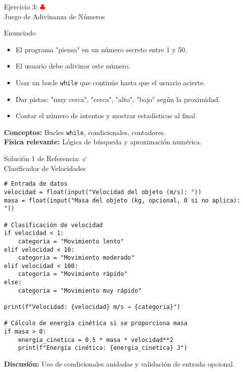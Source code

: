 \documentclass[10pt]{beamer}
\begin{document}
\begin{frame}{Ejercicio 3: \hfill \textcolor{red}{$\clubsuit$} \\ Juego de Adivinanza de Números}
  \begin{block}{Enunciado}
    \begin{itemize}
      \item El programa "piensa" en un número secreto entre 1 y 50.
      \item El usuario debe adivinar este número.
      \item Usar un bucle \texttt{while} que continúe hasta que el usuario acierte.
      \item Dar pistas: "muy cerca", "cerca", "alto", "bajo" según la proximidad.
      \item Contar el número de intentos y mostrar estadísticas al final.
    \end{itemize}
  \end{block}
  
  \textbf{Conceptos:} Bucles \texttt{while}, condicionales, contadores.
  \\
  \textbf{Física relevante:} Lógica de búsqueda y aproximación numérica.
\end{frame}

\begin{frame}[fragile]{Solución 1 de Referencia: \hfill \textcolor{green}{$\checkmark$} \\ Clasificador de Velocidades}
\begin{verbatim}
# Entrada de datos
velocidad = float(input("Velocidad del objeto (m/s): "))
masa = float(input("Masa del objeto (kg, opcional, 0 si no aplica): "))

# Clasificación de velocidad
if velocidad < 1:
    categoria = "Movimiento lento"
elif velocidad < 10:
    categoria = "Movimiento moderado"
elif velocidad < 100:
    categoria = "Movimiento rápido"
else:
    categoria = "Movimiento muy rápido"

print(f"Velocidad: {velocidad} m/s → {categoria}")

# Cálculo de energía cinética si se proporciona masa
if masa > 0:
    energia_cinetica = 0.5 * masa * velocidad**2
    print(f"Energía cinética: {energia_cinetica} J")
\end{verbatim}
\textbf{Discusión:} Uso de condicionales anidadas y validación de entrada opcional.
\end{frame}
\end{document}
